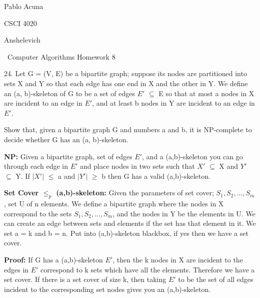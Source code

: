 \documentclass{article}
\begin{document}
Pablo Acuna

CSCI 4020

Anshelevich

{\centering\ Computer Algorithms Homework 8 \par}

24. Let G = (V, E) be a bipartite graph; suppose its nodes
are partitioned into sets X and Y so that each edge has one end
in X and the other in Y. We define an (a, b)-skeleton of G to be
a set of edges $E'$ $\subseteq$ E so that at most a nodes in X are
incident to an edge in $E'$, and at least b nodes in Y are incident
to an edge in $E'$.

Show that, given a bipartite graph G and numbers a and b,
it is NP-complete to decide whether G has an (a, b)-skeleton. \newline

\textbf{NP:} Given a bipartite graph, set of edges $E'$, and a
(a,b)-skeleton you can go through each edge in $E'$ and place
nodes in two sets such that $X'$ $\subseteq$ X and $Y'$
$\subseteq$ Y.  If $|X'|$ $\leq$ a and $|Y'|$ $\geq$ b then
G has a valid (a,b)-skeleton. \newline

\textbf{Set Cover $\leq_{p}$ (a,b)-skeleton:} Given the parameters of set cover;
$S_1, S_2, ..., S_m$, set U of n elements.  We define a bipartite graph where the nodes
in X correspond to the sets $S_1, S_2, ..., S_m$, and the nodes in Y be the elements in U.
We can create an edge between sets and elements if the set has that element
in it.  We set a = k and b = n.  Put into (a,b)-skeleton blackbox, if yes then
we have a set cover. \newline


\textbf{Proof:} If G has a (a,b)-skeleton $E'$, then the k nodes in X are incident
to the edges in $E'$ correspond to k sets which have all the elements.  Therefore we have a set cover.
If there is a set cover of size k, then taking $E'$ to be the set of all edges incident to the corresponding set nodes gives you
an (a,b)-skeleton.





















\clearpage
\end{document}
